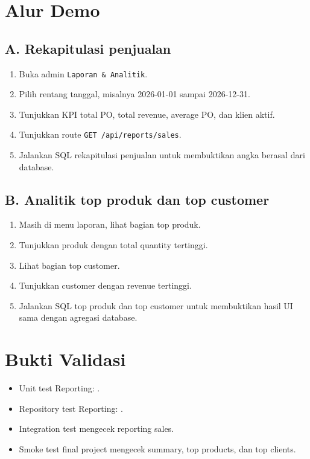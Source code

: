 \documentclass[11pt,a4paper]{article}
\begin{document}
\section*{Alur Demo}
\subsection*{A. Rekapitulasi penjualan}
\begin{enumerate}
\item Buka admin \texttt{Laporan \& Analitik}.
\item Pilih rentang tanggal, misalnya 2026-01-01 sampai 2026-12-31.
\item Tunjukkan KPI total PO, total revenue, average PO, dan klien aktif.
\item Tunjukkan route \texttt{GET /api/reports/sales}.
\item Jalankan SQL rekapitulasi penjualan untuk membuktikan angka berasal dari database.
\end{enumerate}

\subsection*{B. Analitik top produk dan top customer}
\begin{enumerate}
\item Masih di menu laporan, lihat bagian top produk.
\item Tunjukkan produk dengan total quantity tertinggi.
\item Lihat bagian top customer.
\item Tunjukkan customer dengan revenue tertinggi.
\item Jalankan SQL top produk dan top customer untuk membuktikan hasil UI sama dengan agregasi database.
\end{enumerate}

\section*{Bukti Validasi}
\begin{itemize}
\item Unit test Reporting: .
\item Repository test Reporting: .
\item Integration test mengecek reporting sales.
\item Smoke test final project mengecek summary, top products, dan top clients.
\end{itemize}
\end{document}
